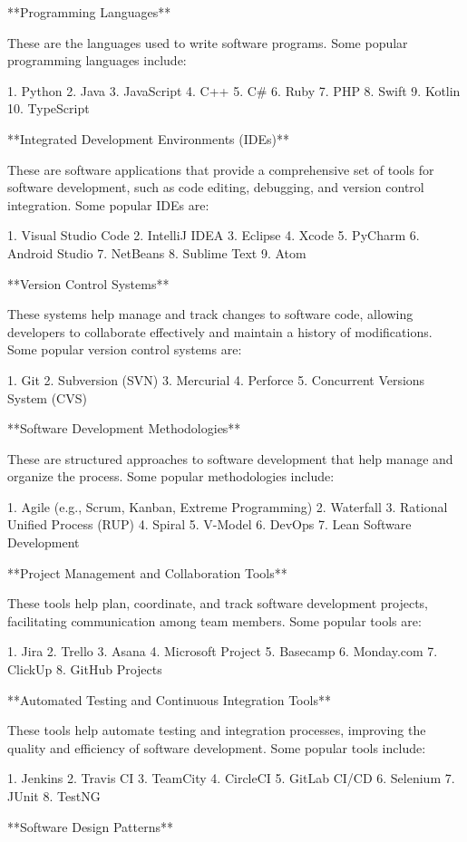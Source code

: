 \documentclass{article}
\begin{document}
**Programming Languages**

These are the languages used to write software programs. Some popular programming languages include:

1. Python
2. Java
3. JavaScript
4. C++
5. C#
6. Ruby
7. PHP
8. Swift
9. Kotlin
10. TypeScript

**Integrated Development Environments (IDEs)**

These are software applications that provide a comprehensive set of tools for software development, such as code editing, debugging, and version control integration. Some popular IDEs are:

1. Visual Studio Code
2. IntelliJ IDEA
3. Eclipse
4. Xcode
5. PyCharm
6. Android Studio
7. NetBeans
8. Sublime Text
9. Atom

**Version Control Systems**

These systems help manage and track changes to software code, allowing developers to collaborate effectively and maintain a history of modifications. Some popular version control systems are:

1. Git
2. Subversion (SVN)
3. Mercurial
4. Perforce
5. Concurrent Versions System (CVS)

**Software Development Methodologies**

These are structured approaches to software development that help manage and organize the process. Some popular methodologies include:

1. Agile (e.g., Scrum, Kanban, Extreme Programming)
2. Waterfall
3. Rational Unified Process (RUP)
4. Spiral
5. V-Model
6. DevOps
7. Lean Software Development

**Project Management and Collaboration Tools**

These tools help plan, coordinate, and track software development projects, facilitating communication among team members. Some popular tools are:

1. Jira
2. Trello
3. Asana
4. Microsoft Project
5. Basecamp
6. Monday.com
7. ClickUp
8. GitHub Projects

**Automated Testing and Continuous Integration Tools**

These tools help automate testing and integration processes, improving the quality and efficiency of software development. Some popular tools include:

1. Jenkins
2. Travis CI
3. TeamCity
4. CircleCI
5. GitLab CI/CD
6. Selenium
7. JUnit
8. TestNG

**Software Design Patterns**
\end{document}
